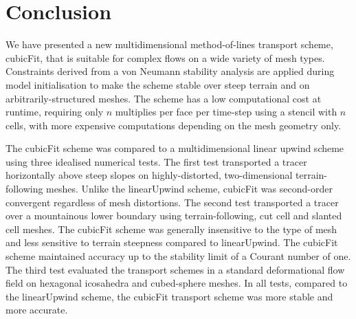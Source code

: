 \section{Conclusion}
\label{sec:conclusion}

We have presented a new multidimensional method-of-lines transport scheme, cubicFit, that is suitable for complex flows on a wide variety of mesh types.  Constraints derived from a von Neumann stability analysis are applied during model initialisation to make the scheme stable over steep terrain and on arbitrarily-structured meshes.
The scheme has a low computational cost at runtime, requiring only $n$ multiplies per face per time-step using a stencil with $n$ cells, with more expensive computations depending on the mesh geometry only.

The cubicFit scheme was compared to a multidimensional linear upwind scheme using three idealised numerical tests.
The first test transported a tracer horizontally above steep slopes on highly-distorted, two-dimensional terrain-following meshes.  Unlike the linearUpwind scheme, cubicFit was second-order convergent regardless of mesh distortions.
The second test transported a tracer over a mountainous lower boundary using terrain-following, cut cell and slanted cell meshes.
The cubicFit scheme was generally insensitive to the type of mesh and less sensitive to terrain steepness compared to linearUpwind.  The cubicFit scheme maintained accuracy up to the stability limit of a Courant number of one.
The third test evaluated the transport schemes in a standard deformational flow field on hexagonal icosahedra and cubed-sphere meshes.
In all tests, compared to the linearUpwind scheme, the cubicFit transport scheme was more stable and more accurate.

